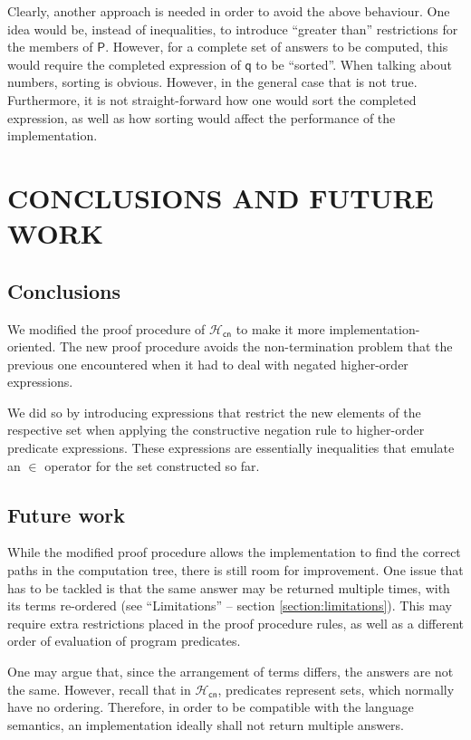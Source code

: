 \documentclass[inscr,ack,preface]{dithesis}
\theoremstyle{definition}
\newcommand{\hcn}{$\mathcal{H}_\mathsf{cn}$}
\newcommand{\msf}[1]{$\mathsf{#1}$}
\begin{document}
Clearly, another approach is needed in order to avoid the above behaviour. One idea would be, instead of inequalities, to introduce ``greater than'' restrictions for the members of \msf{P}. However, for a complete set of answers to be computed, this would require the completed expression of \msf{q} to be ``sorted''. When talking about numbers, sorting is obvious. However, in the general case that is not true. Furthermore, it is not straight-forward how one would sort the completed expression, as well as how sorting would affect the performance of the implementation.

\chapter{CONCLUSIONS AND FUTURE WORK}
\label{chap:conclusion}

\section{Conclusions}
We modified the proof procedure of \hcn{} to make it more implementation-oriented. The new proof procedure avoids the non-termination problem that the previous one encountered when it had to deal with negated higher-order expressions.

We did so by introducing expressions that restrict the new elements of the respective set when applying the constructive negation rule to higher-order predicate expressions. These expressions are essentially inequalities that emulate an $\in$ operator for the set constructed so far.

\section{Future work}
While the modified proof procedure allows the implementation to find the correct paths in the computation tree, there is still room for improvement. One issue that has to be tackled is that the same answer may be returned multiple times, with its terms re-ordered (see ``Limitations'' -- section \ref{section:limitations}). This may require extra restrictions placed in the proof procedure rules, as well as a different order of evaluation of program predicates.

One may argue that, since the arrangement of terms differs, the answers are not the same. However, recall that in \hcn{}, predicates represent sets, which normally have no ordering. Therefore, in order to be compatible with the language semantics, an implementation ideally shall not return multiple answers.
\end{document}
